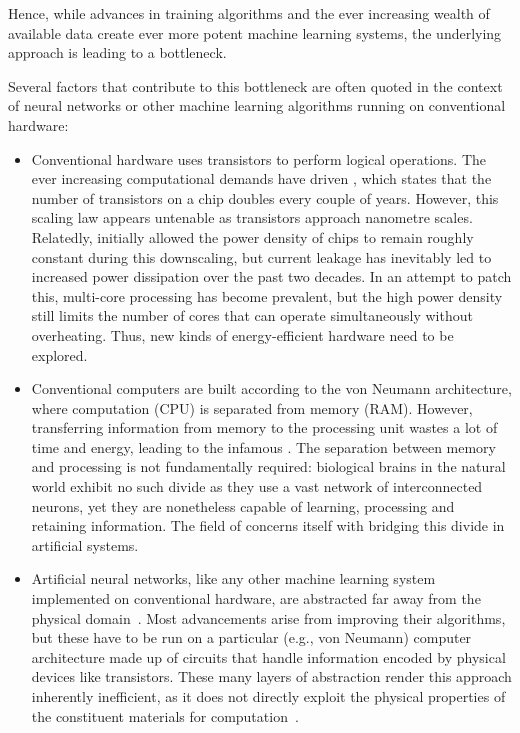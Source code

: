 Hence, while advances in training algorithms and the ever increasing wealth of available data create ever more potent machine learning systems, the underlying approach is leading to a bottleneck. \par
Several factors that contribute to this bottleneck are often quoted in the context of neural networks or other machine learning algorithms running on conventional hardware:
\begin{itemize}
	\item Conventional hardware uses transistors to perform logical operations.
	The ever increasing computational demands have driven , which states that the number of transistors on a chip doubles every couple of years.
	However, this scaling law appears untenable as transistors approach nanometre scales.
	Relatedly,  initially allowed the power density of chips to remain roughly constant during this downscaling, but current leakage has inevitably led to increased power dissipation over the past two decades.
	In an attempt to patch this, multi-core processing has become prevalent, but the high power density still limits the number of cores that can operate simultaneously without overheating. %
	Thus, new kinds of energy-efficient hardware need to be explored.
	\item Conventional computers are built according to the von Neumann architecture, where computation (CPU) is separated from memory (RAM).
	However, transferring information from memory to the processing unit wastes a lot of time and energy, leading to the infamous .
	The separation between memory and processing is not fundamentally required: biological brains in the natural world exhibit no such divide as they use a vast network of interconnected neurons, yet they are nonetheless capable of learning, processing and retaining information.
	The field of  concerns itself with bridging this divide in artificial systems.
	\item Artificial neural networks, like any other machine learning system implemented on conventional hardware, are abstracted far away from the physical domain~\cite{RC_ASI}.
	Most advancements arise from improving their algorithms, but these have to be run on a particular (e.g., von Neumann) computer architecture made up of circuits that handle information encoded by physical devices like transistors.
	These many layers of abstraction render this approach inherently inefficient, as it does not directly exploit the physical properties of the constituent materials for computation~\cite{RC_ASI}.
\end{itemize}
